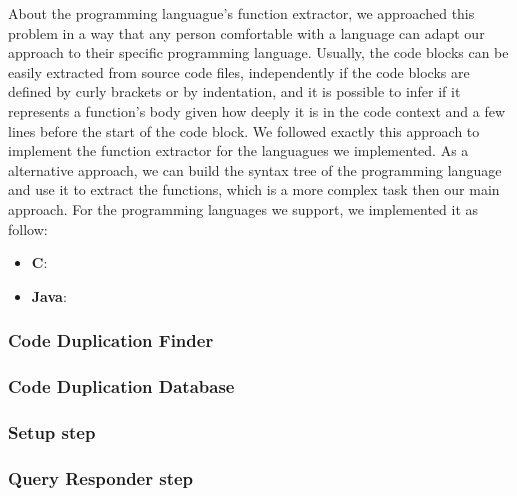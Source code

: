 About the programming languague's function extractor, we approached this problem in a way that any person comfortable with a language
can adapt our approach to their specific programming language. Usually, the code blocks can be easily extracted from 
source code files, independently if the code blocks are defined by curly brackets or by indentation, and it is possible to
infer if it represents a function's body given how deeply it is in the code context and a few lines before the start 
of the code block. We followed exactly this approach to implement the function extractor for the languagues we implemented. 
As a alternative approach, we can build the syntax tree \citep{compiler} of the programming language and use it to 
extract the functions, which is a more complex task then our main approach. For the programming languages we support, we implemented
it as follow:

\begin{itemize}
  \item \textbf{C}:
  \item \textbf{Java}:
\end{itemize}


\subsubsection{Code Duplication Finder}

\subsubsection{Code Duplication Database}

\subsubsection{Setup step}

\subsubsection{Query Responder step}

